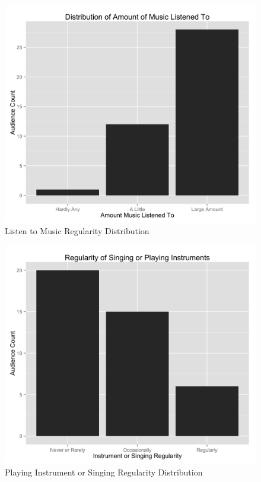 \begin{figure}
    \centering
    \includegraphics[width=1.0\linewidth]{../study-2/results/graphs/music.png}
    \caption{Listen to Music Regularity Distribution}
    \label{musicdistribution}
\end{figure}%

\begin{figure}
    \centering
    \includegraphics[width=1.0\linewidth]{../study-2/results/graphs/instrument-regularity.png}
    \caption{Playing Instrument or Singing Regularity Distribution}
    \label{instrumentdistribution}
\end{figure}


